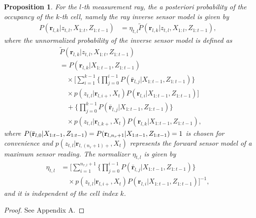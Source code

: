 \documentclass[letterpaper, 10pt, conference]{ieeeconf}
\newtheorem{prop}{Proposition}
\begin{document}
\begin{prop}
For the $l$-th measurement ray, the a posteriori probability of the occupancy of the $k$-th cell, namely the ray inverse sensor model is given by
\begin{align}
\label{eqn:RayISMAnswer}
P(\mathbf{r}_{l,k}|z_{t,l},X_{1:t},Z_{1:t-1})&=\eta_{t,l}\tilde P(\mathbf{r}_{l,k}|z_{t,l},X_{1:t},Z_{1:t-1}),
\end{align}
where the unnormalized probability of the inverse sensor model is defined as
\begin{align}
\label{eqn:Unnormalized}
& \tilde P(\mathbf{r}_{l,k}|z_{t,l},X_{1:t},Z_{1:t-1})\nonumber\\
&=P(\mathbf{r}_{l,k}|X_{1:t-1},Z_{1:t-1})\nonumber\\
&\quad\times 
\bigg[\sum_{i=1}^{k-1}\bigg\{\prod_{j=0}^{i-1}P(\bar{\mathbf{r}}_{l,j}|X_{1:t-1},Z_{1:t-1})\bigg\}\nonumber\\
&\quad\times p(z_{t,l}|\mathbf{r}_{l,i+},X_t)P(\mathbf{r}_{l,i}|X_{1:t-1},Z_{1:t-1})\bigg]\nonumber\\
&\quad + \bigg\{\prod_{j=0}^{k-1}P(\bar{\mathbf{r}}_{l,j}|X_{1:t-1},Z_{1:t-1})\bigg\}\nonumber\\
&\quad\times p(z_{t,l}|\mathbf{r}_{l,k+},X_t)P(\mathbf{r}_{l,k}|X_{1:t-1},Z_{1:t-1}),
\end{align}
where $P(\bar{\mathbf{r}}_{l,0}|X_{1:t-1},Z_{1:t-1})=P(\mathbf{r}_{l,n_r+1}|X_{1:t-1},Z_{1:t-1})\\=1$ is chosen for convenience and $p(z_{t,l}|\mathbf{r}_{l,(n_r+1)+},X_t)$ represents the forward sensor model of a maximum sensor reading. The normalizer $\eta_{t,l}$ is given by
\begin{align}
\label{eqn:allEta}
\eta_{t,l}
&=
\bigg[\sum_{i=1}^{n_{r,l}+1}\bigg\{\prod_{j=0}^{i-1}P(\bar{\mathbf{r}}_{l,j}|X_{1:t-1},Z_{1:t-1})\bigg\}\nonumber\\&\quad\times p(z_{t,l}|\mathbf{r}_{l,i+},X_t)P(\mathbf{r}_{l,i}|X_{1:t-1},Z_{1:t-1})\bigg]^{-1},
\end{align}
and it is independent of the cell index $k$.
\end{prop}
\begin{proof}
See Appendix A.
\end{proof}
\end{document}
